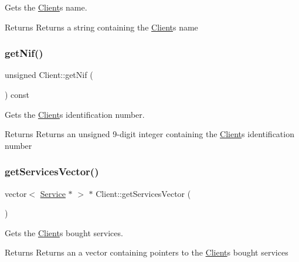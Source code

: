 Gets the \hyperlink{class_client}{Client}\textquotesingle{}s name. 

\begin{DoxyReturn}{Returns}
Returns a string containing the \hyperlink{class_client}{Client}\textquotesingle{}s name 
\end{DoxyReturn}
\mbox{\label{class_client_a35c9fed8cdb36d28fd5e51bd2aee852e}} 
\subsubsection{\texorpdfstring{get\+Nif()}{getNif()}}
{\footnotesize\ttfamily unsigned Client\+::get\+Nif (\begin{DoxyParamCaption}{ }\end{DoxyParamCaption}) const}



Gets the \hyperlink{class_client}{Client}\textquotesingle{}s identification number. 

\begin{DoxyReturn}{Returns}
Returns an unsigned 9-\/digit integer containing the \hyperlink{class_client}{Client}\textquotesingle{}s identification number 
\end{DoxyReturn}
\mbox{\label{class_client_a13ab3e2d37fde2de5b6a40d4523bb999}} 
\subsubsection{\texorpdfstring{get\+Services\+Vector()}{getServicesVector()}}
{\footnotesize\ttfamily vector$<$ \hyperlink{class_service}{Service} $\ast$ $>$ $\ast$ Client\+::get\+Services\+Vector (\begin{DoxyParamCaption}{ }\end{DoxyParamCaption})}



Gets the \hyperlink{class_client}{Client}\textquotesingle{}s bought services. 

\begin{DoxyReturn}{Returns}
Returns an a vector containing pointers to the \hyperlink{class_client}{Client}\textquotesingle{}s bought services 
\end{DoxyReturn}
\mbox{\label{class_client_ac18a40ed6975665b7f7661c8dcf7bf1b}} 
